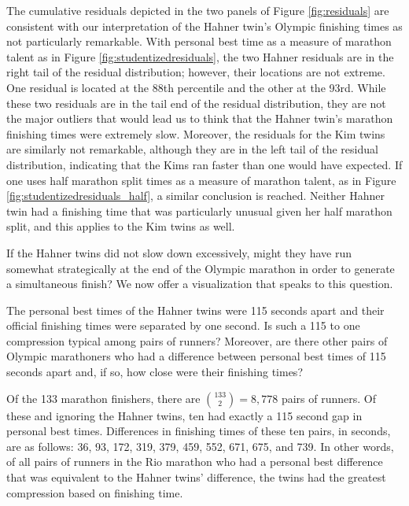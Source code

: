 \documentclass[12pt,titlepage]{article}
\begin{document}
The cumulative residuals depicted in the two panels of Figure
\ref{fig:residuals} are consistent with our interpretation of the
Hahner twin's Olympic finishing times as not particularly
remarkable. With personal best time as a measure of marathon talent as
in Figure \ref{fig:studentizedresiduals}, the two Hahner residuals are
in the right tail of the residual distribution; however, their
locations are not extreme.  One residual is located at the 88th
percentile and the other at the 93rd.  While these two residuals are
in the tail end of the residual distribution, they are not the major
outliers that would lead us to think that the Hahner twin's marathon
finishing times were extremely slow.  Moreover, the residuals for the
Kim twins are similarly not remarkable, although they are in the left
tail of the residual distribution, indicating that the Kims ran faster
than one would have expected.  If one uses half marathon split times
as a measure of marathon talent, as in Figure
\ref{fig:studentizedresiduals_half}, a similar conclusion is reached.
Neither Hahner twin had a finishing time that was particularly unusual
given her half marathon split, and this applies to the Kim twins as
well.

If the Hahner twins did not slow down excessively, might they have run
somewhat strategically at the end of the Olympic marathon in order to
generate a simultaneous finish?  We now offer a visualization that
speaks to this question.

The personal best times of the Hahner twins were 115 seconds apart and
their official finishing times were separated by one second.  Is such
a 115 to one compression typical among pairs of runners?  Moreover,
are there other pairs of Olympic marathoners who had a difference
between personal best times of 115 seconds apart and, if so, how close
were their finishing times?

Of the 133 marathon finishers, there are $\binom{133}{2} = 8,778$
pairs of runners.  Of these and ignoring the Hahner twins, ten had
exactly a 115 second gap in personal best times.  Differences in
finishing times of these ten pairs, in seconds, are as follows: 36,
93, 172, 319, 379, 459, 552, 671, 675, and 739.  In other words, of
all pairs of runners in the Rio marathon who had a personal best
difference that was equivalent to the Hahner twins' difference, the
twins had the greatest compression based on finishing time.
\end{document}
